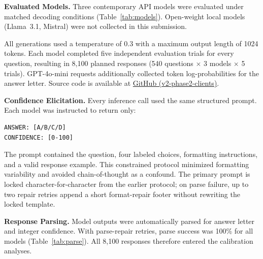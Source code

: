 \documentclass[twoside,twocolumn,10pt]{article}
\begin{document}
\textbf{Evaluated Models.}
Three contemporary API models were evaluated under matched decoding conditions (Table~\ref{tab:models}). Open-weight local models (Llama~3.1, Mistral) were not collected in this submission.

\begin{table}[ht]
\centering
\caption{Language models evaluated in this study.}
\label{tab:models}
\end{table}

All generations used a temperature of 0.3 with a maximum output length of 1024 tokens. Each model completed five independent evaluation trials for every question, resulting in 8{,}100 planned responses (540 questions $\times$ 3 models $\times$ 5 trials). GPT-4o-mini requests additionally collected token log-probabilities for the answer letter. Source code is available at \href{https://github.com/yoyoyohan/llm-calibration-audit/tree/v2-phase2-clients}{GitHub (v2-phase2-clients)}.

\textbf{Confidence Elicitation.}
Every inference call used the same structured prompt. Each model was instructed to return only:

\begin{verbatim}
ANSWER: [A/B/C/D]
CONFIDENCE: [0-100]
\end{verbatim}

The prompt contained the question, four labeled choices, formatting instructions, and a valid response example. This constrained protocol minimized formatting variability and avoided chain-of-thought as a confound. The primary prompt is locked character-for-character from the earlier protocol; on parse failure, up to two repair retries append a short format-repair footer without rewriting the locked template.

\textbf{Response Parsing.}
Model outputs were automatically parsed for answer letter and integer confidence. With parse-repair retries, parse success was 100\% for all models (Table~\ref{tab:parse}). All 8{,}100 responses therefore entered the calibration analyses.
\end{document}
